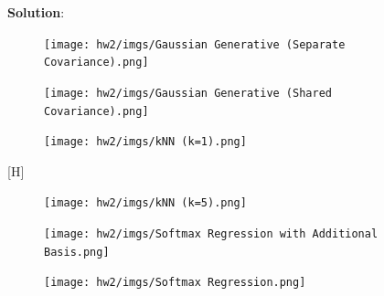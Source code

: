 \documentclass[submit]{../harvardml}
\newenvironment{solution}{
    \vspace{2mm}
    \color{black}\noindent\textbf{Solution}:
}{}
\begin{document}
\begin{solution}
    \begin{figure}[H]
        \centering
        \texttt{[image: hw2/imgs/Gaussian Generative (Separate Covariance).png]}
    \end{figure}
    \begin{figure}[H]
        \centering
        \texttt{[image: hw2/imgs/Gaussian Generative (Shared Covariance).png]}
    \end{figure}
    \begin{figure}[H]
        \centering
        \texttt{[image: hw2/imgs/kNN (k=1).png]}
    \end{figure}[H]
    \begin{figure}
        \centering
        \texttt{[image: hw2/imgs/kNN (k=5).png]}
    \end{figure}
    \begin{figure}[H]
        \centering
        \texttt{[image: hw2/imgs/Softmax Regression with Additional Basis.png]}
    \end{figure}
    \begin{figure}[H]
        \centering
        \texttt{[image: hw2/imgs/Softmax Regression.png]}
    \end{figure}
    

\end{solution}
\end{document}
